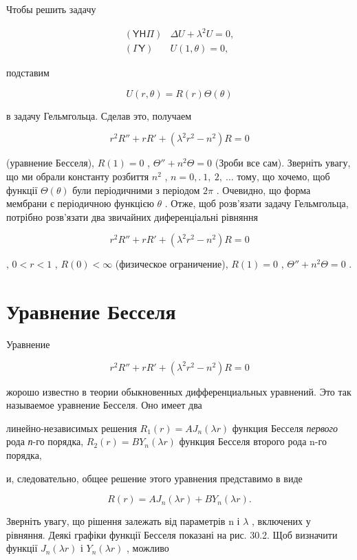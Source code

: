 \documentclass[
  ukrainian,
]{article}
\begin{document}
Чтобы решить задачу

\[
\begin{array}{ll} (\mathsf{Y}\mathsf{H}\mathsf{\Pi}) & \Delta U + \lambda^2 U = 0, \\ (\mathsf{\Gamma}\mathsf{Y}) & U(1, \theta) = 0, \end{array}
\]

подставим

\[
U(r, \theta) = R(r) \Theta(\theta)
\]

в задачу Гельмгольца. Сделав это, получаем

\[
r^2R'' + rR' + (\lambda^2r^2 - n^2)R = 0
\]

(уравнение Бесселя), \(R(1) = 0\) , \(\Theta'' + n^2\Theta = 0\) (Зроби
все сам). Зверніть увагу, що ми обрали константу розбиття \(n^2\) ,
\(n=0,. \ 1,\ 2,\ \ldots\) тому, що хочемо, щоб функції
\(\Theta\left(\theta\right)\) були періодичними з періодом \(2\pi\) .
Очевидно, що форма мембрани є періодичною функцією \(\theta\) . Отже,
щоб розв'язати задачу Гельмгольца, потрібно розв'язати два звичайних
диференціальні рівняння

\[
r^2R'' + rR' + (\lambda^2r^2 - n^2) R = 0
\]

, \(0 < r < 1\) , \(R(0) < \infty\) (физическое ограничение),
\(R(1) = 0\) , \(\Theta'' + n^2\Theta = 0\) .

\section{Уравнение
Бесселя}\label{ux443ux440ux430ux432ux43dux435ux43dux438ux435-ux431ux435ux441ux441ux435ux43bux44f}

Уравнение

\[
r^2R'' + rR' + (\lambda^2r^2 - n^2)R = 0
\]

жорошо известно в теории обыкновенных дифференциальных уравнений. Это
так называемое уравнение Бесселя. Оно имеет два

линейно-независимых решения \(R_{1}(r) = A J_{n}(\lambda r)\) функция
Бесселя \emph{первого} рода \emph{п}-го порядка,
\(R_{2}(r) = BY_{n}(\lambda r)\) функция Бесселя второго рода n-го
порядка,

и, следовательно, общее решение этого уравнения представимо в виде

\[
R(r) = AJ_n(\lambda r) + BY_n(\lambda r).
\]

Зверніть увагу, що рішення залежать від параметрів n і \(\lambda\) ,
включених у рівняння. Деякі графіки функції Бесселя показані на рис.
30.2. Щоб визначити функції \(J_ n(\lambda r)\) і \(Y_n(\lambda r)\) ,
можливо
\end{document}
